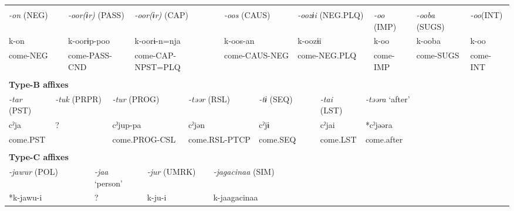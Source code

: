 \tabletail{}
\tablelasttail{}
\begin{tabularx}{\textwidth}{XXXXXXXXXXXXXXXXXXXXX}
\lsptoprule
\multicolumn{21}{X}{{\bfseries Type-A affixes}}\\
\multicolumn{2}{X}{{ \textit{{}-on} (NEG)}} & \multicolumn{5}{X}{{ \textit{{}-oor(ɨr)} (PASS)}} & \multicolumn{5}{X}{{ \textit{{}-oor(ɨr)} (CAP)}} & \multicolumn{3}{X}{{ \textit{{}-oos} (CAUS)}} & \multicolumn{3}{X}{{ \textit{{}-oozɨi} (NEG.PLQ)}} & { \textit{{}-oo} (IMP)} & { \textit{{}-ooba} (SUGS)} & { \textit{{}-oo}(INT)}\\
\multicolumn{2}{X}{{ k-on}} & \multicolumn{5}{X}{{ k-oorɨp-poo}} & \multicolumn{5}{X}{{ k-oorɨ-n=nja}} & \multicolumn{3}{X}{{ k-oos-an}} & \multicolumn{3}{X}{{ k-oozɨi}} & { k-oo} & { k-ooba} & { k-oo}\\
\multicolumn{2}{X}{come-NEG} & \multicolumn{5}{X}{come-PASS-CND} & \multicolumn{5}{X}{come-CAP-NPST=PLQ} & \multicolumn{3}{X}{come-CAUS-NEG} & \multicolumn{3}{X}{come-NEG.PLQ} & come-IMP & come-SUGS & come-INT\\
\multicolumn{21}{X}{}\\
\multicolumn{21}{X}{{\bfseries Type-B affixes}}\\
{ \textit{{}-tar} (PST)} & \multicolumn{4}{X}{{ \textit{{}-tuk} (PRPR)}} & \multicolumn{5}{X}{{ \textit{{}-tur} (PROG)}} & \multicolumn{4}{X}{{ \textit{{}-təər} (RSL)}} & \multicolumn{2}{X}{{ \textit{{}-tɨ} (SEQ)}} & { \textit{{}-tai} (LST)} & \multicolumn{4}{X}{{ \textit{{}-təəra} ‘after’}}\\
{ cˀja} & \multicolumn{4}{X}{{ ?}} & \multicolumn{5}{X}{{ cˀjup-pa}} & \multicolumn{4}{X}{{ cˀjən}} & \multicolumn{2}{X}{{ cˀjɨ}} & { cˀjai} & \multicolumn{4}{X}{{ *cˀjəəra}}\\
come.PST & \multicolumn{4}{X}{} & \multicolumn{5}{X}{come.PROG-CSL} & \multicolumn{4}{X}{come.RSL-PTCP} & \multicolumn{2}{X}{come.SEQ} & come.LST & \multicolumn{4}{X}{{ come.after}}\\
& \multicolumn{4}{X}{} & \multicolumn{5}{X}{} & \multicolumn{4}{X}{} & \multicolumn{2}{X}{} &  & \multicolumn{4}{X}{}\\
\multicolumn{21}{X}{{\bfseries Type-C affixes}}\\
\multicolumn{4}{X}{{ \textit{{}-jawur} (POL)}} & \multicolumn{4}{X}{{ \textit{{}-jaa} ‘person’}} & \multicolumn{3}{X}{{ \textit{{}-jur} (UMRK)}} & \multicolumn{10}{X}{{ \textit{{}-jagacinaa} (SIM)}}\\
\multicolumn{4}{X}{{ *k-jawu-i}} & \multicolumn{4}{X}{{ ?}} & \multicolumn{3}{X}{k-ju-i} & \multicolumn{10}{X}{{ k-jaagacinaa}}\\

\end{tabularx}
